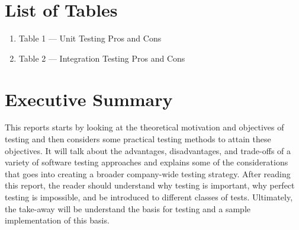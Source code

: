 \documentclass[12pt]{report}
\begin{document}
\section*{List of Tables}
\normalsize{}
\begin{enumerate}[label*={},leftmargin=*,labelsep=2ex,ref=\arabic*]
    \item Table 1 --- Unit Testing Pros and Cons 
    \item Table 2 --- Integration Testing Pros and Cons 

\end{enumerate}



\newpage\thispagestyle{fancy}\sectionfont{\scshape}
\section*{Executive Summary}

This reports starts by looking at the theoretical motivation and objectives of testing and then considers some practical testing methods to attain these objectives. It will talk about the advantages, disadvantages, and trade-offs of a variety of software testing approaches and explains some of the considerations that goes into creating a broader company-wide testing strategy. After reading this report, the reader should understand why testing is important, why perfect testing is impossible, and be introduced to different classes of tests. Ultimately, the take-away will be understand the basis for testing and a sample implementation of this basis.



\newpage\thispagestyle{fancy}\sectionfont{\scshape}

\setcounter{page}{1}
\fancyfoot[C]{\thepage}
\end{document}
